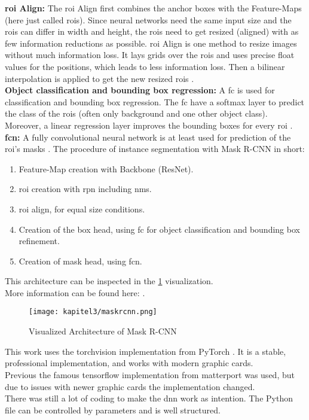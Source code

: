 		\textbf{\ac{roi} Align:} The \ac{roi} Align first combines the anchor boxes with the Feature-Maps (here just called \ac{roi}s). Since neural networks need the same input size and the \ac{roi}s can differ in width and height, the \ac{roi}s need to get resized (aligned) with as few information reductions as possible. \ac{roi} Align is one method to resize images without much information loss. It lays grids over the \ac{roi}s and uses precise float values for the positions, which leads to less information loss. Then a bilinear interpolation is applied to get the new resized \ac{roi}s \cite{Kaiming2017}.\\
		\textbf{Object classification and bounding box regression:} A \ac{fc} is used for classification and bounding box regression. The \ac{fc} have a softmax layer to predict the class of the \ac{roi}s (often only background and one other object class). Moreover, a linear regression layer improves the bounding boxes for every \ac{roi} \cite{Ren2016}.
		\textbf{\ac{fcn}:} A fully convolutional neural network is at least used for prediction of the \ac{roi}'s masks \cite{Kang2014}.
		\newpage
		The procedure of instance segmentation with Mask R-CNN in short:
		\begin{enumerate}
			\item Feature-Map creation with Backbone (ResNet).
			\item \ac{roi} creation with \ac{rpn} including \ac{nms}.
			\item \ac{roi} align, for equal size conditions.
			\item Creation of the box head, using \ac{fc} for object classification and bounding box refinement.
			\item Creation of mask head, using \ac{fcn}.
		\end{enumerate}
		This architecture can be inspected in the \ref{img:maskrcnn} visualization.\\
		More information can be found here: \cite{Kaiming2017}\cite{Ramesh2021}. 
		
		\begin{figure}[h]
			\centering
			\texttt{[image: kapitel3/maskrcnn.png]}
			\caption[Visualized Architecture of Mask R-CNN by Tobia Ippolito]{Visualized Architecture of Mask R-CNN}
			\label{img:maskrcnn}
		\end{figure}
		
		This work uses the torchvision implementation from PyTorch \cite{Torchvision}. It is a stable, professional implementation, and works with modern graphic cards.\\
		Previous the famous tensorflow implementation from matterport \cite{Matterport} was used, but due to issues with newer graphic cards the implementation changed.\\
		There was still a lot of coding to make the \ac{dnn} work as intention. The Python file can be controlled by parameters and is well structured.\\
		
